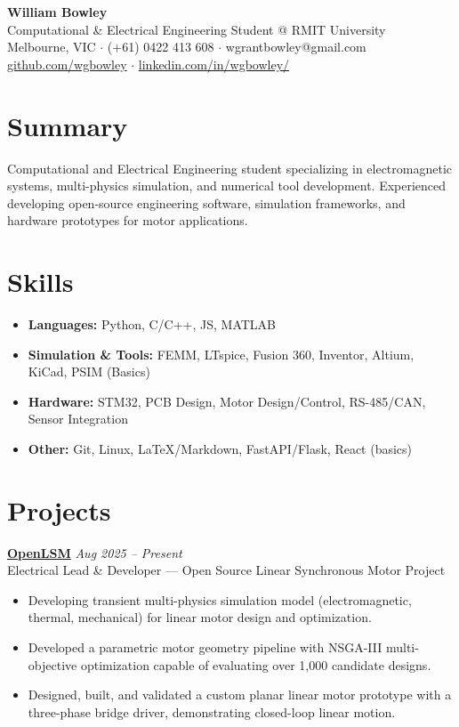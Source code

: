 \documentclass[11pt,a4paper]{article}
\begin{document}
\begin{center}
    {\LARGE \textbf{William Bowley}} \\[4pt]
    {\large Computational \& Electrical Engineering Student @ RMIT University} \\[2pt]
    Melbourne, VIC \quad $\cdot$ \quad (+61) 0422 413 608 \quad $\cdot$ \quad wgrantbowley@gmail.com \\[2pt]
    \href{https://github.com/wgbowley}{github.com/wgbowley} \quad $\cdot$ \quad 
    \href{https://linkedin.com/in/wgbowley}{linkedin.com/in/wgbowley/}
\end{center}

\section*{Summary}
Computational and Electrical Engineering student specializing in electromagnetic systems, multi-physics simulation, and numerical tool development. 
Experienced developing open-source engineering software, simulation frameworks, and hardware prototypes for motor applications.

\section*{Skills}
\begin{itemize}[leftmargin=*, noitemsep, topsep=0pt]
    \item \textbf{Languages:} Python, C/C++, JS, MATLAB
    \item \textbf{Simulation \& Tools:} FEMM, LTspice, Fusion 360, Inventor, Altium, KiCad, PSIM (Basics)
    \item \textbf{Hardware:} STM32, PCB Design, Motor Design/Control, RS-485/CAN, Sensor Integration
    \item \textbf{Other:} Git, Linux, LaTeX/Markdown, FastAPI/Flask, React (basics)
\end{itemize}

\section*{Projects}

\noindent\textbf{\href{https://github.com/wgbowley/openLSM}{OpenLSM}} \hfill \textit{Aug 2025 -- Present} \\
Electrical Lead \& Developer — Open Source Linear Synchronous Motor Project
\begin{itemize}[leftmargin=*, noitemsep]
    \item Developing transient multi-physics simulation model (electromagnetic, thermal, mechanical) for linear motor design and optimization.
    \item Developed a parametric motor geometry pipeline with NSGA-III multi-objective optimization capable of evaluating over 1,000 candidate designs.
    \item Designed, built, and validated a custom planar linear motor prototype with a three-phase bridge driver, demonstrating closed-loop linear motion.
\end{itemize}
\end{document}
